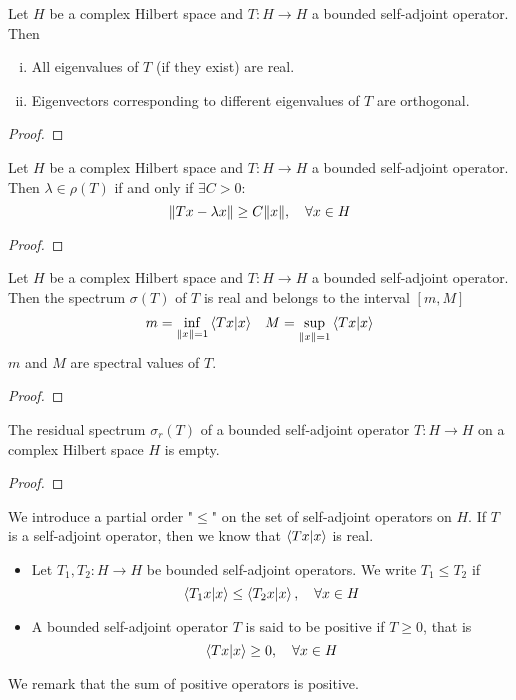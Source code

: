 \documentclass[../../script.tex]{subfiles}
\begin{document}
\begin{thm}
    Let $H$ be a complex Hilbert space and $T: H \rightarrow H$ a bounded self-adjoint operator. Then 
    \begin{enumerate}[(i)]
        \item All eigenvalues of $T$ (if they exist) are real.
        \item Eigenvectors corresponding to different eigenvalues of $T$ are orthogonal.
    \end{enumerate}
\end{thm}
\begin{proof}
    \noproof
\end{proof}

\begin{thm}
    Let $H$ be a complex Hilbert space and $T: H \rightarrow H$ a bounded self-adjoint operator. Then $\lambda \in \rho(T)$ if and only if $\exists C > 0$:
    \[
        \norm{Tx - \lambda x} \ge C \norm{x}, \quad \forall x \in H
    \]
\end{thm}
\begin{proof}
    \noproof
\end{proof}

\begin{thm}[Spectrum]
    Let $H$ be a complex Hilbert space and $T: H \rightarrow H$ a bounded self-adjoint operator. Then the spectrum $\sigma(T)$ of $T$ is real and belongs to the interval $[m, M]$
    \begin{align*}
        m = \inf_{\norm{x} = 1} \innerproduct{Tx}{x} && M = \sup_{\norm{x} = 1} \innerproduct{Tx}{x}
    \end{align*}
    $m$ and $M$ are spectral values of $T$.
\end{thm}
\begin{proof}
    \noproof
\end{proof}

\begin{thm}
    The residual spectrum $\sigma_r(T)$ of a bounded self-adjoint operator $T: H \rightarrow H$ on a complex Hilbert space $H$ is empty.
\end{thm}
\begin{proof}
    \noproof
\end{proof}

\begin{defi}
    We introduce a partial order "$\le$" on the set of self-adjoint operators on $H$. If $T$ is a self-adjoint operator, then we know that $\innerproduct{Tx}{x}$ is real.
    \begin{itemize}
        \item Let $T_1, T_2: H \rightarrow H$ be bounded self-adjoint operators. We write $T_1 \le T_2$ if 
        \[
            \innerproduct{T_1x}{x} \le \innerproduct{T_2x}{x}, \quad \forall x \in H
        \]
        \item A bounded self-adjoint operator $T$ is said to be positive if $T \ge 0$, that is 
        \[
            \innerproduct{Tx}{x} \ge 0, \quad \forall x \in H
        \]
    \end{itemize}
    We remark that the sum of positive operators is positive.
\end{defi}
\end{document}
